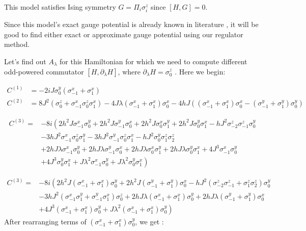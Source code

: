 \documentclass[11pt,a4paper]{article}
\begin{document}
This model satisfies Ising symmetry $G= \Pi_i \sigma_i^z$ since $[H, G]=0$.


Since this model's exact gauge potential is already known in literature \cite{del2012assisted, kolodrubetz2016geometry}, it will be good to find either exact or approximate gauge potential using our regulator method.


Let's find out $A_{\lambda}$ for this Hamiltonian for which we need to compute different odd-powered commutator $[H, \partial_{\lambda} H]$, where $\partial_{\lambda} H=\sigma_0^z$ . Here we begin:

\begin{align}
 C^{(1)}&= -2 i J \sigma_0^y ( \sigma_{-1}^x + \sigma_1^x) \\ 
 C^{(2)}&= 8 J^2  (\sigma_0^z  +  \sigma_{-1}^x  \sigma_0^z  \sigma_1^x)- 4 J \lambda  (\sigma_{-1}^x +  \sigma_{1}^x) \sigma_0^ x  -4 h J ( (\sigma_{-1}^ x + \sigma_{1}^ x)  \sigma_0^x - (\sigma_{-1}^ y +\sigma_1^y )  \sigma_0^y ) 
 \end{align}
 
\begin{align*}
C^{(3)}= & -8 i \left(2 h^2 J \sigma _{-1}^x\sigma _{0}^y+2  h^2 J  \sigma _{-1}^y\sigma _{0}^x+2 h^2 J \sigma_{0}^x\sigma _{1}^y+   2 h^2 J \sigma _{0}^y\sigma _{1}^x-hJ^2 \sigma _{-2}^z\sigma _{-1}^z\sigma _{0}^y \right. \\
& \left. -3 h J^2 \sigma _{-1}^x\sigma_{0}^z\sigma _{1}^y-3  h J^2 \sigma _{-1}^y\sigma _{0}^z\sigma _{1}^x -hJ^2 \sigma _{0}^y\sigma _{1}^z\sigma _{2}^z \right.\\
& \left. + 2 h J \lambda\sigma _{-1}^x\sigma _{0}^y+2 h J \lambda \sigma _{-1}^y\sigma _{0}^x+2 h J \lambda\sigma _{0}^x\sigma _{1}^y+2 h J \lambda\sigma _{0}^y\sigma _{1}^x+4 J^3\sigma _{-1}^x\sigma _{0}^y \right.\\
& \left. +4 J^3\sigma_{0}^y \sigma_{1}^x+J \lambda ^2 \sigma _{-1}^x\sigma _{0}^y+J \lambda ^2\sigma _{0}^y \sigma_{1}^x \right)
\end{align*}


 
\begin{align*}
C^{(3)}= & -8 i \left(2 h^2 J (\sigma _{-1}^x+ \sigma _{1}^x)\sigma _{0}^y +2  h^2 J  (\sigma _{-1}^y + \sigma_1^y)\sigma _{0}^x -hJ^2( \sigma _{-2}^z\sigma _{-1}^z + \sigma _{1}^z\sigma _{2}^z) \sigma _{0}^y \right. \\
& \left. -3 h J^2 (\sigma _{-1}^x\sigma _{1}^y + \sigma _{-1}^y\sigma _{1}^x)\sigma _{0}^z  
 + 2 h J \lambda(\sigma _{-1}^x + \sigma _{1}^x) \sigma _{0}^y+2 h J \lambda (\sigma _{-1}^y +\sigma _{1}^y)\sigma _{0}^x  \right.\\
& \left.+ 4 J^3(\sigma _{-1}^x+ \sigma _{1}^x)\sigma _{0}^y  +J \lambda ^2(\sigma _{-1}^x+ \sigma _{1}^x)\sigma _{0}^y  \right)
\end{align*}
After rearranging terms of $(\sigma _{-1}^x+ \sigma _{1}^x)\sigma _{0}^y$, we get :
\end{document}
